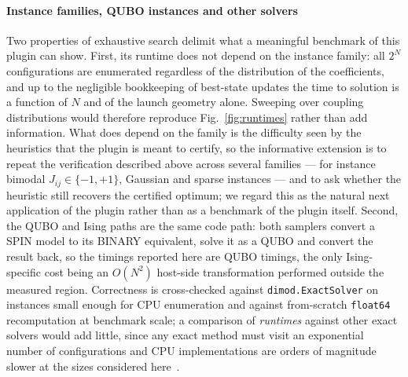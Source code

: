 \documentclass[preprint,12pt,a4paper]{elsarticle}
\begin{document}
\paragraph{Instance families, QUBO instances and other solvers}
Two properties of exhaustive search delimit what a meaningful benchmark of this
plugin can show. First, its runtime does not depend on the instance family: all
$2^{N}$ configurations are enumerated regardless of the distribution of the
coefficients, and up to the negligible bookkeeping of best-state updates the time
to solution is a function of $N$ and of the launch geometry alone. Sweeping over
coupling distributions would therefore reproduce Fig.~\ref{fig:runtimes} rather
than add information. What does depend on the family is the difficulty seen by
the heuristics that the plugin is meant to certify, so the informative extension
is to repeat the verification described above across several families --- for
instance bimodal $J_{ij}\in\{-1,+1\}$, Gaussian and sparse instances --- and to
ask whether the heuristic still recovers the certified optimum; we regard this as
the natural next application of the plugin rather than as a benchmark of the
plugin itself. Second, the QUBO and Ising paths are the same code path: both
samplers convert a SPIN model to its BINARY equivalent, solve it as a QUBO and
convert the result back, so the timings reported here are QUBO timings, the only
Ising-specific cost being an $O(N^{2})$ host-side transformation performed
outside the measured region. Correctness is cross-checked against
\texttt{dimod.ExactSolver} on instances small enough for CPU enumeration and
against from-scratch \texttt{float64} recomputation at benchmark scale; a
comparison of \emph{runtimes} against other exact solvers would add little, since
any exact method must visit an exponential number of configurations and CPU
implementations are orders of magnitude slower at the sizes considered
here~\cite{jalowiecki2021brute}.
\end{document}
